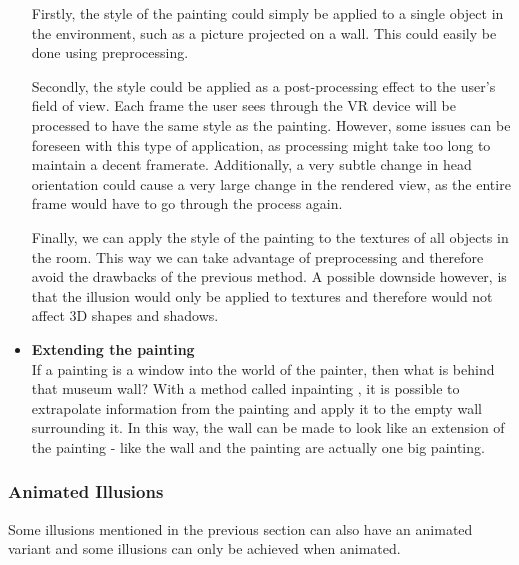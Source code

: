 \documentclass[a4paper]{article}
\begin{document}
\begin{itemize}
Firstly, the style of the painting could simply be applied to a single object in the environment, such as a picture projected on a wall. This could easily be done using preprocessing. 

Secondly, the style could be applied as a post-processing effect to the user's field of view. Each frame the user sees through the VR device will be processed to have the same style as the painting. However, some issues can be foreseen with this type of application, as processing might take too long to maintain a decent framerate. Additionally, a very subtle change in head orientation could cause a very large change in the rendered view, as the entire frame would have to go through the process again. 

Finally, we can apply the style of the painting to the textures of all objects in the room. This way we can take advantage of preprocessing and therefore avoid the drawbacks of the previous method. A possible downside however, is that the illusion would only be applied to textures and therefore would not affect 3D shapes and shadows.

\item{\textbf{Extending the painting}}
\\If a painting is a window into the world of the painter, then what is behind that museum wall? With a method called inpainting \cite{inpainting}, it is possible to extrapolate information from the painting and apply it to the empty wall surrounding it. In this way, the wall can be made to look like an extension of the painting - like the wall and the painting are actually one big painting.

\end{itemize}

\subsubsection{Animated Illusions}\label{sec:animeffects}

Some illusions mentioned in the previous section can also have an animated variant and some illusions can only be achieved when animated.
\end{document}
